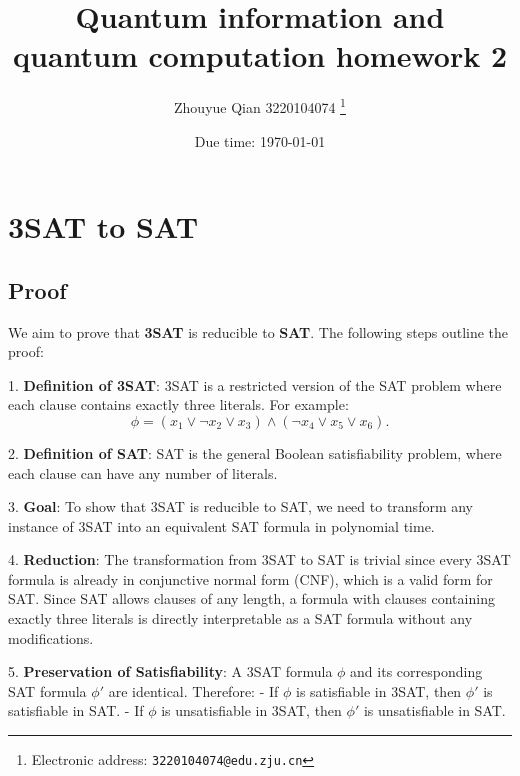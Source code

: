\documentclass[a4paper]{article}
\begin{document}
\title{Quantum information and quantum computation homework 2}

\author{Zhouyue Qian 3220104074
  \thanks{Electronic address: \texttt{3220104074@edu.zju.cn}}}


\date{Due time: \today}

\maketitle


\section{3SAT to SAT}
\subsection*{Proof}
We aim to prove that \textbf{3SAT} is reducible to \textbf{SAT}. The following steps outline the proof:

1. \textbf{Definition of 3SAT}:  
   3SAT is a restricted version of the SAT problem where each clause contains exactly three literals. For example:
   \[
   \phi = (x_1 \lor \neg x_2 \lor x_3) \land (\neg x_4 \lor x_5 \lor x_6).
   \]

2. \textbf{Definition of SAT}:  
   SAT is the general Boolean satisfiability problem, where each clause can have any number of literals.

3. \textbf{Goal}:  
   To show that 3SAT is reducible to SAT, we need to transform any instance of 3SAT into an equivalent SAT formula in polynomial time.

4. \textbf{Reduction}:  
   The transformation from 3SAT to SAT is trivial since every 3SAT formula is already in conjunctive normal form (CNF), which is a valid form for SAT.  
   Since SAT allows clauses of any length, a formula with clauses containing exactly three literals is directly interpretable as a SAT formula without any modifications.

5. \textbf{Preservation of Satisfiability}:  
   A 3SAT formula \( \phi \) and its corresponding SAT formula \( \phi' \) are identical. Therefore:  
   - If \( \phi \) is satisfiable in 3SAT, then \( \phi' \) is satisfiable in SAT.  
   - If \( \phi \) is unsatisfiable in 3SAT, then \( \phi' \) is unsatisfiable in SAT.
\end{document}
